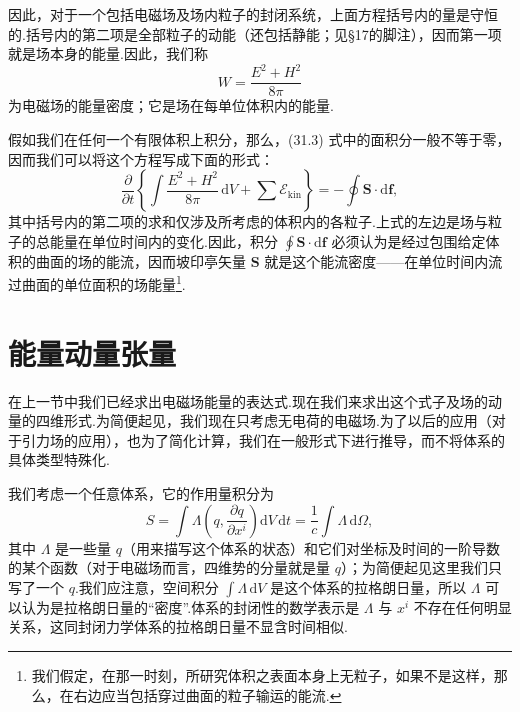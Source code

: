 因此，对于一个包括电磁场及场内粒子的封闭系统，上面方程括号内的量是守恒的.括号内的第二项是全部粒子的动能（还包括静能；见§17的脚注），因而第一项就是场本身的能量.因此，我们称
\begin{equation}
  W=\frac{E^2+H^2}{8\pi}
\end{equation}
为电磁场的能量密度；它是场在每单位体积内的能量.

假如我们在任何一个有限体积上积分，那么，(31.3)
式中的面积分一般不等于零，因而我们可以将这个方程写成下面的形式：
\begin{equation}
  \frac{\partial}{\partial t}\left\{\int\frac{E^2+H^2}{8\pi}\,\mathrm{d}V
  +\sum\mathcal{E}_\mathrm{kin}\right\}
  =-\oint\boldsymbol{S}\cdot\mathrm{d}\boldsymbol{f},
\end{equation}
其中括号内的第二项的求和仅涉及所考虑的体积内的各粒子.上式的左边是场与粒子的总能量在单位时间内的变化.因此，积分
$\oint\boldsymbol{S}\cdot\mathrm{d}\boldsymbol{f}$
必须认为是经过包围给定体积的曲面的场的能流，因而坡印亭矢量 $\boldsymbol{S}$
就是这个能流密度——在单位时间内流过曲面的单位面积的场能量\footnote{我们假定，在那一时刻，所研究体积之表面本身上无粒子，如果不是这样，那么，在右边应当包括穿过曲面的粒子输运的能流.}.

\section{能量动量张量}

在上一节中我们已经求出电磁场能量的表达式.现在我们来求出这个式子及场的动量的四维形式.为简便起见，我们现在只考虑无电荷的电磁场.为了以后的应用（对于引力场的应用），也为了简化计算，我们在一般形式下进行推导，而不将体系的具体类型特殊化.

我们考虑一个任意体系，它的作用量积分为
\begin{equation}
  S=\int\varLambda\left(q,\frac{\partial q}{\partial x^i}\right)
  \mathrm{d}V\,\mathrm{d}t
  =\frac{1}{c}\int\varLambda\,\mathrm{d}\varOmega,
\end{equation}
其中 $\varLambda$
是一些量 $q$（用来描写这个体系的状态）和它们对坐标及时间的一阶导数的某个函数（对于电磁场而言，四维势的分量就是量
$q$）；为简便起见这里我们只写了一个 $q$.我们应注意，空间积分 $\int\varLambda\,\mathrm{d}V$
是这个体系的拉格朗日量，所以 $\varLambda$
可以认为是拉格朗日量的“密度”.体系的封闭性的数学表示是 $\varLambda$ 与 $x^i$
不存在任何明显关系，这同封闭力学体系的拉格朗日量不显含时间相似.

